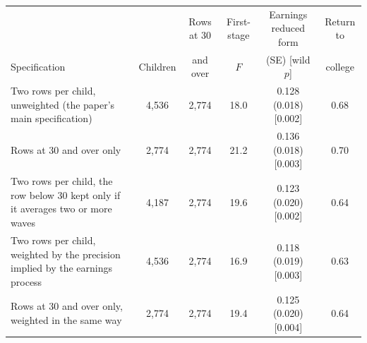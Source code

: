 \begin{tabular}{@{}p{6.2cm}ccccc@{}}
\toprule
 & & Rows at 30 & First-stage & Earnings reduced form & Return to \\
Specification & Children & and over & $F$ & (SE) [wild $p$] & college \\
\midrule
Two rows per child, unweighted (the paper's main specification) & 4,536 & 2,774 & 18.0 & 0.128 (0.018) [0.002] & 0.68 \\
Rows at 30 and over only & 2,774 & 2,774 & 21.2 & 0.136 (0.018) [0.003] & 0.70 \\
Two rows per child, the row below 30 kept only if it averages two or more waves & 4,187 & 2,774 & 19.6 & 0.123 (0.020) [0.002] & 0.64 \\
Two rows per child, weighted by the precision implied by the earnings process & 4,536 & 2,774 & 16.9 & 0.118 (0.019) [0.003] & 0.63 \\
Rows at 30 and over only, weighted in the same way & 2,774 & 2,774 & 19.4 & 0.125 (0.020) [0.004] & 0.64 \\
\bottomrule
\end{tabular}
